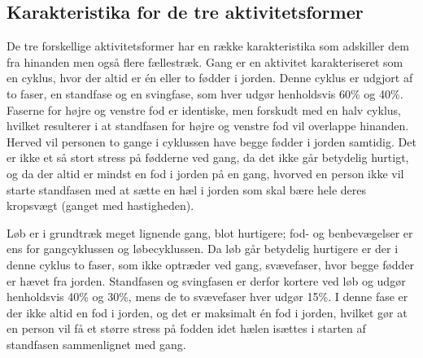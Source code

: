 


\subsection{Karakteristika for de tre aktivitetsformer}

De tre forskellige aktivitetsformer har en række karakteristika som adskiller dem fra hinanden men også flere fællestræk. \newline 
Gang er en aktivitet karakteriseret som en cyklus, hvor der altid er én eller to fødder i jorden. Denne cyklus er udgjort af to faser, en standfase og en svingfase, som hver udgør henholdsvis 60\% og 40\%.
Faserne for højre og venstre fod er identiske, men forskudt med en halv cyklus, hvilket resulterer i at standfasen for højre og venstre fod vil overlappe hinanden. Herved vil personen to gange i cyklussen have begge fødder i jorden samtidig. \newline
Det er ikke et så stort stress på fødderne ved gang, da det ikke går betydelig hurtigt, og da der altid er mindst en fod i jorden på en gang, hvorved en person ikke vil starte standfasen med at sætte en hæl i jorden som skal bære hele deres kropsvægt (ganget med hastigheden).

Løb er i grundtræk meget lignende gang, blot hurtigere; fod- og benbevægelser er ens for gangcyklussen og løbecyklussen. Da løb går betydelig hurtigere er der i denne cyklus to faser, som ikke optræder ved gang, svævefaser, hvor begge fødder er hævet fra jorden. Standfasen og svingfasen er derfor kortere ved løb og udgør henholdsvis 40\% og 30\%, mens de to svævefaser hver udgør 15\%. \newline
I denne fase er der ikke altid en fod i jorden, og det er maksimalt én fod i jorden, hvilket gør at en person vil få et større stress på fodden idet hælen isættes i starten af standfasen sammenlignet med gang.

